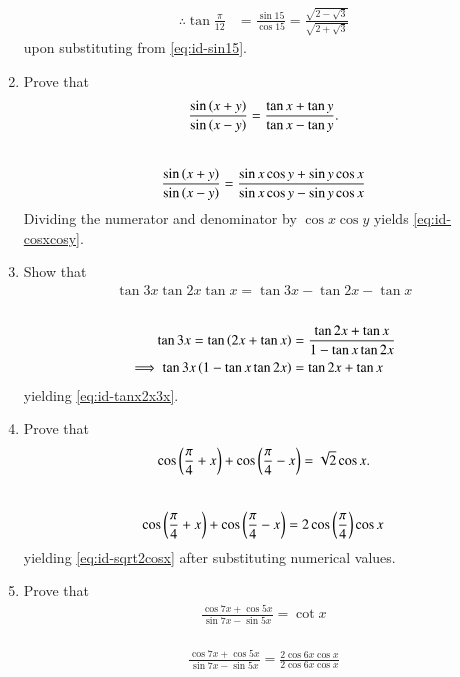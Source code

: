 \begin{enumerate}[label=\thesubsection.\arabic*,ref=\thesubsection.\theenumi,itemsep=1ex]
\begin{align}
	 \label{eq:id-cos15}
	 \\
	 \therefore 
	\tan\frac{\pi}{12} &= \frac{\sin 15}{\cos15}
	 = \frac{\sqrt{2-\sqrt{3}}}{\sqrt{2+\sqrt{3}}}
	 \label{eq:id-tan15}
\end{align}
upon substituting from 
	 \eqref{eq:id-sin15}.
\item Prove that 
\begin{align}
	\frac{\sin\left(x+y\right)}{\sin\left(x-y\right)} = \frac{\tan x + \tan y}{\tan x - \tan y}.
	 \label{eq:id-cosxcosy}
\end{align}
%
	\\
	\solution
\begin{align}
\frac{\sin\left(x+y\right)}{\sin\left(x-y\right)} = \frac{\sin x \cos y +\sin y \cos x }{\sin x \cos y -\sin y \cos x }
\end{align}
Dividing the numerator and denominator by $\cos x \cos y$
%
yields
	 \eqref{eq:id-cosxcosy}.
\item Show that
\begin{align}
	 \label{eq:id-tanx2x3x}
\tan3x\tan2x\tan x = \tan3x-\tan2x-\tan x
\end{align}
%
\\
\solution
\begin{align}
	\tan3x = \tan \left(2x +\tan x\right) &= \frac{\tan 2x + \tan x}{1 - \tan x \tan 2x}
	\\
	\implies 
	\tan3x \left(1 - \tan x \tan 2x\right)&= {\tan 2x + \tan x}
\end{align}
%
yielding
	 \eqref{eq:id-tanx2x3x}.
\item Prove that
\begin{align}
\cos\left(\frac{\pi}{4}+x\right) + \cos\left(\frac{\pi}{4}-x\right) = \sqrt 2\cos x.
	 \label{eq:id-sqrt2cosx}
\end{align}
%
\\
\solution
\begin{align}
\cos\left(\frac{\pi}{4}+x\right) + \cos\left(\frac{\pi}{4}-x\right) = 
2\cos\left(\frac{\pi}{4}\right) \cos x  
\end{align}
yielding
	 \eqref{eq:id-sqrt2cosx}
	 after substituting numerical values.
%
\item Prove that 
%
\begin{align}
\frac{\cos7x+\cos5x}{\sin7x-\sin 5x} 
=\cot x
	 \label{eq:id-cotx}
\end{align}
%
\\
\solution
\begin{align}
\frac{\cos7x+\cos5x}{\sin7x-\sin 5x} 
=\frac{2\cos6x\cos x}{2\cos 6x\cos x} 
\end{align}

\end{enumerate}
